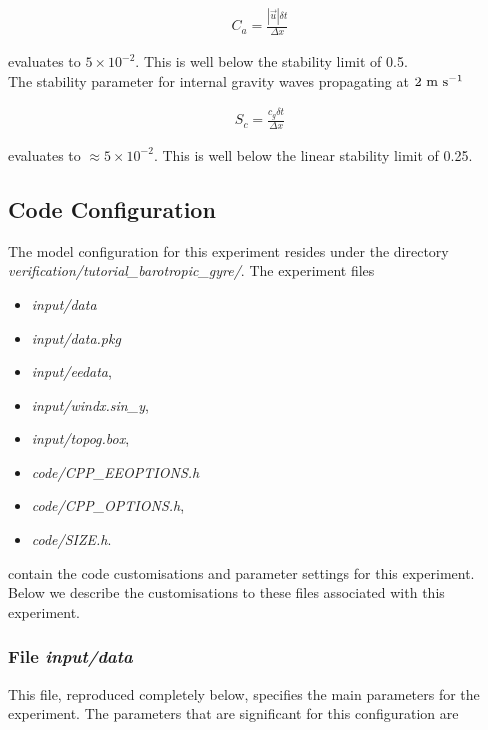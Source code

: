 \begin{eqnarray}
\label{EQ:eg-fourlayer-cfl_stability}
C_{a} = \frac{| \vec{u} | \delta t}{ \Delta x}
\end{eqnarray}

\noindent evaluates to $5 \times 10^{-2}$. This is well below the stability 
limit of 0.5.
\\

\noindent The stability parameter for internal gravity waves
propagating at $2~{\rm m}~{\rm s}^{-1}$ 

\begin{eqnarray}
\label{EQ:eg-fourlayer-igw_stability}
S_{c} = \frac{c_{g} \delta t}{ \Delta x}
\end{eqnarray}

\noindent evaluates to $\approx 5 \times 10^{-2}$. This is well below the linear
stability limit of 0.25.
  
\subsection{Code Configuration}
\label{www:tutorials}
\label{SEC:eg_fourl_code_config}

The model configuration for this experiment resides under the 
directory {\it verification/tutorial\_barotropic\_gyre/}.
The experiment files 
\begin{itemize}
\item {\it input/data}
\item {\it input/data.pkg}
\item {\it input/eedata},
\item {\it input/windx.sin\_y},
\item {\it input/topog.box},
\item {\it code/CPP\_EEOPTIONS.h}
\item {\it code/CPP\_OPTIONS.h},
\item {\it code/SIZE.h}. 
\end{itemize}
contain the code customisations and parameter settings for this
experiment. Below we describe the customisations to these files
associated with this experiment.

\subsubsection{File {\it input/data}}
\label{www:tutorials}

This file, reproduced completely below, specifies the main parameters 
for the experiment. The parameters that are significant for this configuration
are


